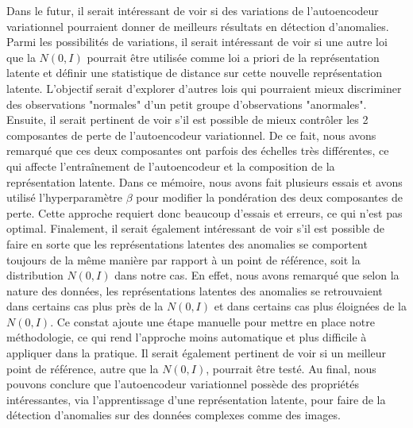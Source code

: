 Dans le futur, il serait intéressant de voir si des variations de l'autoencodeur variationnel pourraient donner de meilleurs résultats en détection d'anomalies. Parmi les possibilités de variations, il serait intéressant de voir si une autre loi que la $N(0,I)$ pourrait être utilisée comme loi a priori de la représentation latente et définir une statistique de distance sur cette nouvelle représentation latente. L'objectif serait d'explorer d'autres lois qui pourraient mieux discriminer des observations "normales" d'un petit groupe d'observations "anormales". Ensuite, il serait pertinent de voir s'il est possible de mieux contrôler les 2 composantes de perte de l'autoencodeur variationnel. De ce fait, nous avons remarqué que ces deux composantes ont parfois des échelles très différentes, ce qui affecte l'entraînement de l'autoencodeur et la composition de la représentation latente. Dans ce mémoire, nous avons fait plusieurs essais et avons utilisé l'hyperparamètre $\beta$  pour modifier la pondération des deux composantes de perte. Cette approche requiert donc beaucoup d'essais et erreurs, ce qui n'est pas optimal. Finalement, il serait également intéressant de voir s'il est possible de faire en sorte que les représentations latentes des anomalies se comportent toujours de la même manière par rapport à un point de référence, soit la distribution $N(0,I)$ dans notre cas. En effet, nous avons remarqué que selon la nature des données, les représentations latentes des anomalies se retrouvaient dans certains cas plus près de la $N(0,I)$ et dans certains cas  plus éloignées de la $N(0,I)$. Ce constat ajoute une étape manuelle pour mettre en place notre méthodologie, ce qui rend l'approche moins automatique et plus difficile à appliquer dans la pratique. Il serait également pertinent de voir si un meilleur point de référence, autre que la $N(0,I)$, pourrait être testé. Au final, nous pouvons conclure que l'autoencodeur variationnel possède des propriétés intéressantes, via l'apprentissage d'une représentation latente, pour faire de la détection d'anomalies sur des données complexes comme des images.


